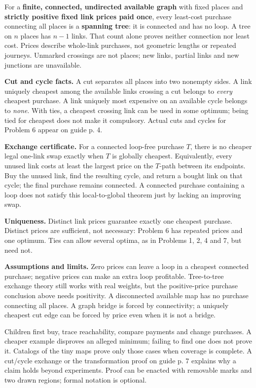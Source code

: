 \documentclass[11pt,letterpaper]{article}
\newcommand\topic[1]{\par\vspace{5pt}{\large\bfseries #1}\par}
\begin{document}
\topic{Mathematical overview: the destination}
For a \textbf{finite, connected, undirected available graph} with fixed places and \textbf{strictly positive fixed link prices paid once}, every least-cost purchase connecting all places is a \textbf{spanning tree}: it is connected and has no loop. A tree on $n$ places has $n-1$ links. That count alone proves neither connection nor least cost. Prices describe whole-link purchases, not geometric lengths or repeated journeys. Unmarked crossings are not places; new links, partial links and new junctions are unavailable.

\textbf{Cut and cycle facts.} A cut separates all places into two nonempty sides. A link uniquely cheapest among the available links crossing a cut belongs to \emph{every} cheapest purchase. A link uniquely most expensive on an available cycle belongs to \emph{none}. With ties, a cheapest crossing link can be used in some optimum; being tied for cheapest does not make it compulsory. Actual cuts and cycles for Problem 6 appear on guide p. 4.

\textbf{Exchange certificate.} For a connected loop-free purchase $T$, there is no cheaper legal one-link swap exactly when $T$ is globally cheapest. Equivalently, every unused link costs at least the largest price on the $T$-path between its endpoints. Buy the unused link, find the resulting cycle, and return a bought link on that cycle; the final purchase remains connected. A connected purchase containing a loop does not satisfy this local-to-global theorem just by lacking an improving swap.

\textbf{Uniqueness.} Distinct link prices guarantee exactly one cheapest purchase. Distinct prices are sufficient, not necessary: Problem 6 has repeated prices and one optimum. Ties can allow several optima, as in Problems 1, 2, 4 and 7, but need not.

\textbf{Assumptions and limits.} Zero prices can leave a loop in a cheapest connected purchase; negative prices can make an extra loop profitable. Tree-to-tree exchange theory still works with real weights, but the positive-price purchase conclusion above needs positivity. A disconnected available map has no purchase connecting all places. A graph bridge is forced by connectivity; a uniquely cheapest cut edge can be forced by price even when it is not a bridge.

\topic{Experiments, conjectures and explanations}
Children first buy, trace reachability, compare payments and change purchases. A cheaper example disproves an alleged minimum; failing to find one does not prove it. Catalogs of the tiny maps prove only those cases when coverage is complete. A cut/cycle exchange or the transformation proof on guide p. 7 explains why a claim holds beyond experiments. Proof can be enacted with removable marks and two drawn regions; formal notation is optional.
\end{document}
